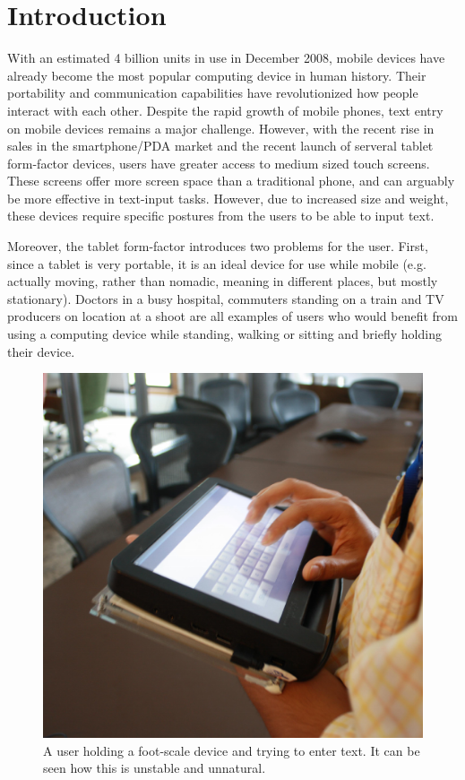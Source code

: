 \section{Introduction}

With an estimated 4 billion units in use in December 2008, mobile
devices have already become the most popular computing device in human
history. Their portability and communication capabilities have
revolutionized how people interact with each other. Despite the rapid
growth of mobile phones, text entry on mobile devices remains a major
challenge. However, with the recent rise in sales in the
smartphone/PDA market and the recent launch of serveral tablet
form-factor devices, users have greater access to medium sized touch
screens. These screens offer more screen space than a traditional
phone, and can arguably be more effective in text-input
tasks. However, due to increased size and weight, these devices
require specific postures from the users to be able to input text.

Moreover, the tablet form-factor introduces two problems for the user.
First, since a tablet is very portable, it is an ideal device for use
while mobile (e.g. actually moving, rather than nomadic, meaning in
different places, but mostly stationary).  Doctors in a busy hospital,
commuters standing on a train and TV producers on location at a shoot
are all examples of users who would benefit from using a computing
device while standing, walking or sitting and briefly holding their
device.

\begin{figure}
    \includegraphics[scale=0.35]{Figures/device_hold.pdf} 
  	\caption{A user holding a foot-scale device and trying to enter text. It can be seen how this is unstable and unnatural.}
    \label{fig:device_hold}
\end{figure}

